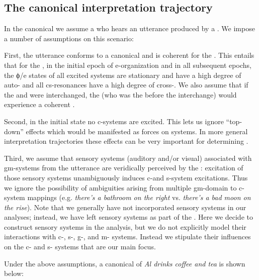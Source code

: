 \subsection{The canonical interpretation trajectory}

In the canonical  we assume a  who hears an utterance produced by a . We impose a number of assumptions on this scenario:

First, the utterance conforms to a canonical  and is coherent for the . This entails that for the , in the initial epoch of e-organization and in all subsequent epochs, the ϕ/e states of all excited systems are stationary and have a high degree of auto- and all cs-resonances have a high degree of cross-. We also assume that if the  and  were interchanged, the  (who was the  before the interchange) would experience a coherent . 

Second, in the initial state no c-systems are excited. This lets us ignore “top-down” effects which would be manifested as  forces on systems. In more general interpretation trajectories these effects can be very important for determining .

Third, we assume that sensory systems (auditory and/or visual) associated with gm-systems from the utterance are veridically perceived by the : excitation of those sensory systems unambiguously induces c-and s-system excitations. Thus we ignore the possibility of ambiguities arising from multiple gm-domain to c-system mappings (e.g. \textit{there’s a bathroom on the right} vs. \textit{there’s a bad moon on the rise}). Note that we generally have not incorporated sensory systems in our analyses; instead, we have left sensory systems as part of the . Here we decide to construct sensory systems in the analysis, but we do not explicitly model their interactions with c-, s-, g-, and m- systems. Instead we stipulate their influences on the c- and s- systems that are our main focus.

Under the above assumptions, a canonical  of \textit{Al drinks coffee and tea} is shown below:

